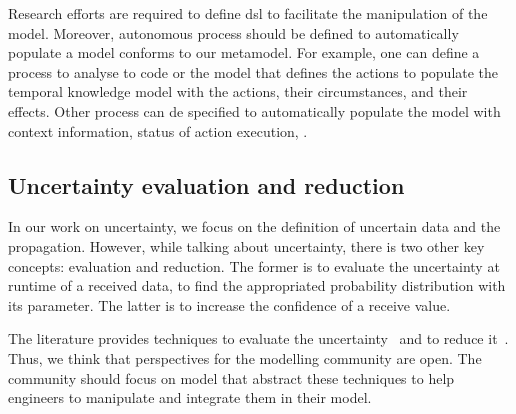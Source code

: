 Research efforts are required to define \gls{dsl} to facilitate the manipulation of the \gls{model}.
Moreover, autonomous process should be defined to automatically populate a \gls{model} conforms to our \gls{metamodel}.
For example, one can define a process to analyse to code or the model that defines the \glspl{action} to populate the temporal knowledge \gls{model} with the actions, their circumstances, and their effects.
Other process can de specified to automatically populate the \gls{model} with context information, status of action execution, \etc.

\subsection{Uncertainty evaluation and reduction}
In our work on uncertainty, we focus on the definition of uncertain data and the propagation.
However, while talking about uncertainty, there is two other key concepts: evaluation and reduction.
The former is to evaluate the uncertainty at runtime of a received data, \eg to find the appropriated probability distribution with its parameter.
The latter is to increase the confidence of a receive value.

The literature provides techniques to evaluate the uncertainty~\cite{wubbeler2008evaluation, metrology2008evaluation} and to reduce it~\cite{shafer1992dempster}.
Thus, we think that perspectives for the modelling community are open.
The community should focus on model that abstract these techniques to help engineers to manipulate and integrate them in their model.
